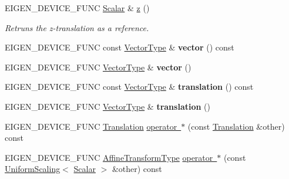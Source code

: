 \begin{DoxyCompactItemize}
E\+I\+G\+E\+N\+\_\+\+D\+E\+V\+I\+C\+E\+\_\+\+F\+U\+NC \mbox{\hyperlink{class_eigen_1_1_translation_ad596bf21ced4b902cc242205df486e21}{Scalar}} \& \mbox{\hyperlink{class_eigen_1_1_translation_a2005b284cac066c63e22541afbe3af39}{z}} ()
\begin{DoxyCompactList}\small\item\em Retruns the z-\/translation as a reference. \end{DoxyCompactList}\item 
\mbox{\label{class_eigen_1_1_translation_a32dfe108b6ec918236c13a7626309a10}} 
E\+I\+G\+E\+N\+\_\+\+D\+E\+V\+I\+C\+E\+\_\+\+F\+U\+NC const \mbox{\hyperlink{class_eigen_1_1_translation_a339e17dfec5394ae563f62cca0df451f}{Vector\+Type}} \& {\bfseries vector} () const
\item 
\mbox{\label{class_eigen_1_1_translation_a4b710dbdc7a24d7f0eca3903f4c6fea6}} 
E\+I\+G\+E\+N\+\_\+\+D\+E\+V\+I\+C\+E\+\_\+\+F\+U\+NC \mbox{\hyperlink{class_eigen_1_1_translation_a339e17dfec5394ae563f62cca0df451f}{Vector\+Type}} \& {\bfseries vector} ()
\item 
\mbox{\label{class_eigen_1_1_translation_a78815be07de549220678c1d5136af0fb}} 
E\+I\+G\+E\+N\+\_\+\+D\+E\+V\+I\+C\+E\+\_\+\+F\+U\+NC const \mbox{\hyperlink{class_eigen_1_1_translation_a339e17dfec5394ae563f62cca0df451f}{Vector\+Type}} \& {\bfseries translation} () const
\item 
\mbox{\label{class_eigen_1_1_translation_aa4de2c71c19f782237e4d9ed318aa5a3}} 
E\+I\+G\+E\+N\+\_\+\+D\+E\+V\+I\+C\+E\+\_\+\+F\+U\+NC \mbox{\hyperlink{class_eigen_1_1_translation_a339e17dfec5394ae563f62cca0df451f}{Vector\+Type}} \& {\bfseries translation} ()
\item 
E\+I\+G\+E\+N\+\_\+\+D\+E\+V\+I\+C\+E\+\_\+\+F\+U\+NC \mbox{\hyperlink{class_eigen_1_1_translation}{Translation}} \mbox{\hyperlink{class_eigen_1_1_translation_aadd931cc42f529f502bb8c483e1995b6}{operator $\ast$}} (const \mbox{\hyperlink{class_eigen_1_1_translation}{Translation}} \&other) const
\item 
E\+I\+G\+E\+N\+\_\+\+D\+E\+V\+I\+C\+E\+\_\+\+F\+U\+NC \mbox{\hyperlink{class_eigen_1_1_translation_a25c762409320ba9490a0d12c6652bbad}{Affine\+Transform\+Type}} \mbox{\hyperlink{class_eigen_1_1_translation_a64d809cd1bee92a0f86f0900e5b99783}{operator $\ast$}} (const \mbox{\hyperlink{class_eigen_1_1_uniform_scaling}{Uniform\+Scaling}}$<$ \mbox{\hyperlink{class_eigen_1_1_translation_ad596bf21ced4b902cc242205df486e21}{Scalar}} $>$ \&other) const

\end{DoxyCompactItemize}
